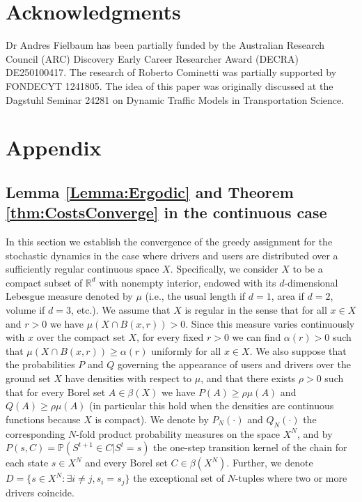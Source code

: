 \documentclass[12pt,english]{article}
\begin{document}
{\section*{Acknowledgments}
Dr Andres Fielbaum has been partially funded by the Australian Research Council (ARC) Discovery Early Career Researcher Award (DECRA) DE250100417. The research of Roberto Cominetti was partially supported by FONDECYT 1241805.
The idea of this paper was originally discussed at the Dagstuhl Seminar 24281 on Dynamic Traffic Models in Transportation Science. 


 



\section*{Appendix}


\subsection*{Lemma \ref{Lemma:Ergodic} and Theorem \ref{thm:CostsConverge} in the continuous case}


 In this section we establish the convergence of the greedy assignment for the stochastic dynamics in the case where drivers and users are distributed over a sufficiently regular continuous space $X$. 
Specifically, we consider  $X$ to be a compact subset of $\mathbb{R}^d$ with nonempty interior, endowed with its $d$-dimensional Lebesgue measure denoted by $\mu$ (i.e., the usual length if $d=1$, area if $d=2$, volume if $d=3$, etc.). We assume that $X$ is regular in the sense that for all $x\in X$ and $r>0$ we have
$\mu(X\cap B(x,r))>0$.
Since this measure varies continuously with $x$ over the compact set $X$,  for every fixed $r>0$ we can find $\alpha(r)>0$ such that 
$\mu(X\cap B(x,r))\geq\alpha(r)$
uniformly for all $x\in X$.
We also suppose that the probabilities
$P$ and $Q$ governing the appearance of users and drivers over the ground set $X$ have densities with respect to $\mu$, 
and that there exists $\rho>0$ such that for every Borel set $A\in\beta(X)$ we have $P(A)\geq\rho\mu(A)$ and $Q(A)\geq\rho\mu(A)$ (in particular this hold when the densities are continuous functions because $X$ is compact). 
We denote by $P_N(\cdot)$  and $Q_N(\cdot)$ the corresponding $N$-fold product probability measures on the space $X^N$,
and by $P(s,C)=\mathbb{P}(S^{t+1}\in C|S^t=s)$ the one-step transition kernel of the chain for each state $s\in X^N$ and every Borel set $C\in\beta(X^N)$. 
Further, we denote $D=\{s \in X^N: \exists i\neq j, s_i=s_j\}$ the exceptional set of $N$-tuples where two or more drivers coincide.


}
\end{document}
